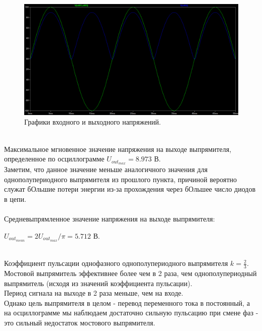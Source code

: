 \documentclass[12pt]{article}
\begin{document}
\begin{figure}[H]
    \centering
    \includegraphics[width=\textwidth]{3_voltages.png}
    \caption{Графики входного и выходного напряжений.}
    \label{fig:3_voltages.png}
\end{figure}\\
Максимальное мгновенное значение напряжения на выходе выпрямителя, определенное по осциллограмме $U_{out_{max}} = 8.973$ В.\\
Заметим, что данное значение меньше аналогичного значения для однополупериодного выпрямителя из прошлого пункта, причиной вероятно служат бОльшие потери энергии из-за прохождения через бОльшее число диодов в цепи.\\
\ \\
Средневыпрямленное значение напряжения на выходе выпрямителя:
\begin{center}
    $U_{out_{mean}} = 2U_{out_{max}} / \pi = 5.712$ В.
\end{center}
\ \\
Коэффициент пульсации однофазного однополупериодного выпрямителя $k = \frac{2}{3}$.\\
Мостовой выпрямитель эффективнее более чем в 2 раза, чем однополупериодный выпрямитель (исходя из значений коэффициента пульсации).\\
Период сигнала на выходе в 2 раза меньше, чем на входе.\\
Однако цель выпрямителя в целом - перевод переменного тока в постоянный, а на осциллограмме мы наблюдаем достаточно сильную пульсацию при смене фаз - это сильный недостаток мостового выпрямителя.
\end{document}
